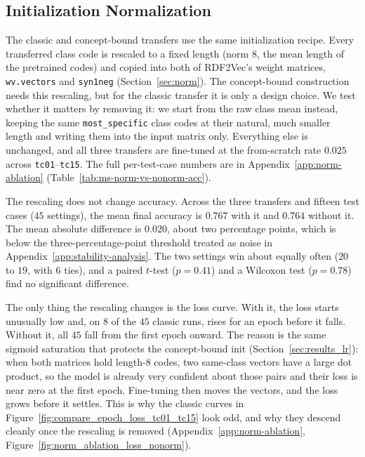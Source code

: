 \documentclass[a4paper,oneside,bibliography=totoc]{scrbook}
\begin{document}
\subsection{Initialization Normalization}
\label{sec:results_norm_ablation}

The classic and concept-bound transfers use the same initialization recipe.
Every transferred class code is rescaled to a fixed length (norm $8$, the mean
length of the pretrained codes) and copied into both of RDF2Vec's weight
matrices, \texttt{wv.vectors} and \texttt{syn1neg} (Section~\ref{sec:norm}). The
concept-bound construction needs this rescaling, but for the classic transfer it
is only a design choice. We test whether it matters by removing it: we start from
the raw class mean instead, keeping the same \texttt{most\_specific} class codes
at their natural, much smaller length and writing them into the input matrix
only. Everything else is unchanged, and all three transfers are fine-tuned at the
from-scratch rate $0.025$ across \texttt{tc01}--\texttt{tc15}. The full
per-test-case numbers are in Appendix~\ref{app:norm-ablation}
(Table~\ref{tab:ms-norm-vs-nonorm-acc}).

The rescaling does not change accuracy. Across the three transfers and fifteen
test cases ($45$ settings), the mean final accuracy is $0.767$ with it and
$0.764$ without it. The mean absolute difference is $0.020$, about two percentage
points, which is below the three-percentage-point threshold treated as noise in
Appendix~\ref{app:stability-analysis}. The two settings win about equally often
($20$ to $19$, with $6$ ties), and a paired $t$-test ($p=0.41$) and a Wilcoxon
test ($p=0.78$) find no significant difference.

The only thing the rescaling changes is the loss curve. With it, the loss starts
unusually low and, on $8$ of the $45$ classic runs, rises for an epoch before it
falls. Without it, all $45$ fall from the first epoch onward. The reason is the
same sigmoid saturation that protects the concept-bound init
(Section~\ref{sec:results_lr}): when both matrices hold length-$8$ codes, two
same-class vectors have a large dot product, so the model is already very
confident about those pairs and their loss is near zero at the first epoch.
Fine-tuning then moves the vectors, and the loss grows before it settles. This is
why the classic curves in Figure~\ref{fig:compare_epoch_loss_tc01_tc15} look odd,
and why they descend cleanly once the rescaling is removed
(Appendix~\ref{app:norm-ablation}, Figure~\ref{fig:norm_ablation_loss_nonorm}).
\end{document}
